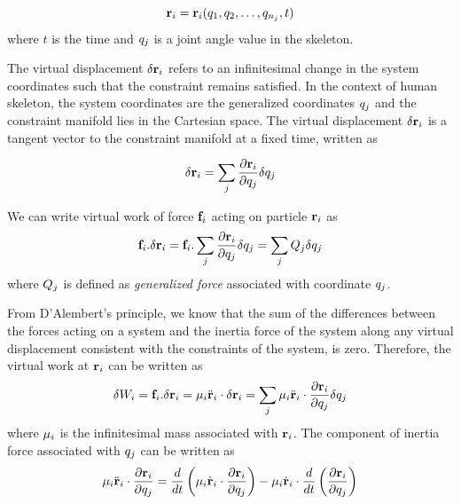 \begin{equation}\label{eq:general_coord}
    \mathbf{r}_i = \mathbf{r}_i(q_{1},
q_{2}, \ldots, q_{n_j}, t)
\end{equation}
where $t$ is the time and $q_j$ is a joint angle value in
the skeleton.

The virtual displacement $\delta \mathbf{r}_i$ refers to an
infinitesimal change in the system coordinates such that the
constraint remains satisfied. In the context of human skeleton, the
system coordinates are the generalized coordinates $q_j$ and the
constraint manifold lies in the Cartesian space. The virtual
displacement $\delta \mathbf{r}_i$ is a tangent vector to the
constraint manifold at a fixed time, written as

\begin{equation}\label{eq:virtual_displace}
    \delta \mathbf{r}_i = \sum_j \frac{\partial \mathbf{r}_i}{\partial
    q_j}\delta q_j
\end{equation}

We can write virtual work of force $\mathbf{f}_{i}$ acting on particle
$\mathbf{r}_i$ as
\begin{equation}\label{eq:virtual_work}
  \mathbf{f}_{i} . \delta \mathbf{r}_i = \mathbf{f}_{i} . \sum_j \frac{\partial \mathbf{r}_i}{\partial
    q_j}\delta q_j = \sum_j Q_{j} \delta q_j
\end{equation}
where $Q_{j}$ is defined as \emph{generalized force}
associated with coordinate $q_j$.

From D'Alembert's principle, we know that the sum of the differences
between the forces acting on a system and the inertia force of the
system along any virtual displacement consistent with the constraints
of the system, is zero. Therefore, the virtual work at $\mathbf{r}_i$ can be written as
\begin{equation}\label{eq:inertial_work}
  \delta W_i = \mathbf{f}_{i} . \delta \mathbf{r}_i = \mathbf{\mu}_i \ddot{\mathbf{r}}_i \cdot
    \delta \mathbf{r}_i = \sum_j \mathbf{\mu}_i \ddot{\mathbf{r}}_i \cdot
    \frac{\partial \mathbf{r}_i}{\partial q_j} \delta q_j
\end{equation}
where $\mathbf{\mu}_i$ is the infinitesimal mass associated with
$\mathbf{r}_i$. The component of inertia force associated with
$q_j$ can be written as
\begin{equation}
\label{eq:inertia_force}
  \mathbf{\mu}_i \ddot{\mathbf{r}}_i \cdot \frac{\partial \mathbf{r}_i}{\partial q_j} =
  \frac{d}{dt} \left( \mathbf{\mu}_i \dot{\mathbf{r}}_i \cdot \frac{\partial
  \mathbf{r}_i}{\partial q_j} \right) - \mathbf{\mu}_i
\dot{\mathbf{r}}_i \cdot \frac{d}{dt} \left( \frac{\partial
    \mathbf{r}_i}{\partial q_j} \right) 
\end{equation}

